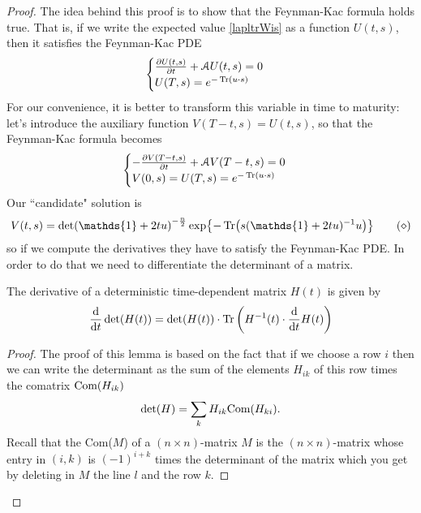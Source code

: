 \begin{proof}
    The idea behind this proof is to show that the Feynman-Kac formula holds true. That is, if we write the expected value \eqref{lapltrWis} as a function $U(t,s)$, then it satisfies the Feynman-Kac PDE
    \begin{equation*}
    \begin{cases}
        \pdv{U(t,s)}{t} + \mathcal{A}U(t,s) = 0 \\
        U(T,s) = e^{-\Tr(u\cdot s)}
    \end{cases}
    \end{equation*}
    For our convenience, it is better to transform this variable in time to maturity: let's introduce the auxiliary function $V(T-t,s) = U(t,s)$, so that the Feynman-Kac formula becomes
    \begin{equation*}
    \begin{cases}
        -\pdv{V(T-t,s)}{t} + \mathcal{A}V(T-t,s) = 0 \\
        V(0,s) = U(T,s) = e^{-\Tr(u\cdot s)}
    \end{cases}
    \end{equation*}
    Our ``candidate" solution is
    \begin{equation}\label{vts}
        V(t,s) = \det(\mathds{1}+2tu)^{-\frac{n}{2}}\exp{-\Tr(s(\mathds{1}+2tu)^{-1}u)}\tag{$\diamond$}
    \end{equation}
    so if we compute the derivatives they have to satisfy the Feynman-Kac PDE. In order to do that we need to differentiate the determinant of a matrix.
    \begin{lemma}
        The derivative of a deterministic time-dependent matrix $H(t)$ is given by
        \begin{equation*}
            \dv{}{t}\det(H(t)) = \det(H(t))\cdot\Tr\left(H^{-1}(t)\cdot\dv{}{t}H(t)\right)
        \end{equation*}
    \end{lemma}
    \begin{proof}
        The proof of this lemma is based on the fact that if we choose a row $i$ then we can write the determinant as the sum of the elements $H_{ik}$ of this row times the comatrix $\text{Com}(H_{ik})$
        \begin{equation*}
            \det(H) = \sum_k H_{ik}\text{Com}(H_{ki}).
        \end{equation*}
        Recall that the Com($M$) of a $(n\times n)$-matrix $M$ is the $(n \times n)$-matrix whose entry in $(i,k)$ is $(-1)^{i+k}$ times the determinant of the matrix which you get by deleting in $M$ the line $l$ and the row $k$.

\end{proof}
\end{proof}
